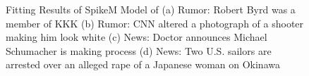 \begin{figure}[!h]

  \centering


\caption{Fitting Results of SpikeM Model of (a) Rumor: Robert Byrd was a member of KKK (b) Rumor: CNN altered a photograph of a shooter making him look white (c) News: Doctor announces Michael Schumacher is making process (d) News: Two U.S. sailors are arrested over an alleged rape of a Japanese woman on Okinawa }
\label{fig:SPikeModel}
\end{figure}

